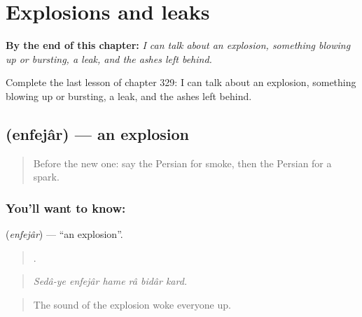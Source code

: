 
\chapter{Explosions and leaks}
\label{ch:fa-explosions-and-leaks}

\begin{chapteropening}
\textbf{By the end of this chapter:} \emph{I can talk about an explosion, something blowing up or bursting, a leak, and the ashes left behind.}

Complete the last lesson of chapter 329: I can talk about an explosion, something blowing up or bursting, a leak, and the ashes left behind.
\end{chapteropening}

\section[\texorpdfstring{\fa{انفجار} (enfejâr)}{انفجار (enfejâr)}]{ (enfejâr) — an explosion}

\label{lesson:FA-C329-enfejar}



\begin{quote}
Before the new one: say the Persian for smoke, then the Persian for a spark.
\end{quote}

\subsection*{You'll want to know: }
\textbf{} (\emph{enfejâr}) — \textquotedblleft{}an explosion\textquotedblright{}.

\begin{quote}
     .
\end{quote}

\begin{quote}
\emph{Sedâ-ye enfejâr hame râ bidâr kard.}
\end{quote}

\begin{quote}
The sound of the explosion woke everyone up.
\end{quote}

